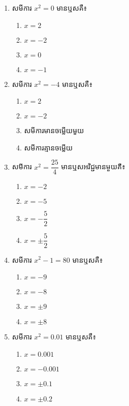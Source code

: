 \begin{enumerate}
\item សមីការ $x^2=0$ មានឬសគឺ៖
\begin{multicols}{4}
\begin{enumerate}[label=\alph*.]
	\item $x=2$
	\item $x=-2$
	\item $x=0$
	\item $x=-1$
\end{enumerate}
\end{multicols}

\item សមីការ $x^2=-4$ មានឬសគឺ៖
\begin{multicols}{2}
\begin{enumerate}[label=\alph*.]
	\item $x=2$
	\item $x=-2$
	\item សមីការមានចម្លើយមួយ
	\item សមីការគ្មានចម្លើយ
\end{enumerate}
\end{multicols}

\item សមីការ $x^2=\dfrac{25}{4}$ មានឬសអវិជ្ជមានមួយគឺ៖
\begin{multicols}{4}
\begin{enumerate}[label=\alph*.]
	\item $x=-2$
	\item $x=-5$
	\item $x=-\dfrac{5}{2}$
	\item $x=\pm \dfrac{5}{2}$
\end{enumerate}
\end{multicols}

\item សមីការ $x^2-1=80$ មានឬសគឺ៖
\begin{multicols}{4}
\begin{enumerate}[label=\alph*.]
	\item $x=-9$
	\item $x=-8$
	\item $x=\pm 9$
	\item $x=\pm 8$
\end{enumerate}
\end{multicols}

\item សមីការ $x^2=0.01$ មានឬសគឺ៖
\begin{multicols}{4}
\begin{enumerate}[label=\alph*.]
	\item $x=0.001$
	\item $x=-0.001$
	\item $x=\pm 0.1$
	\item $x=\pm 0.2$
\end{enumerate}
\end{multicols}


\end{enumerate}
